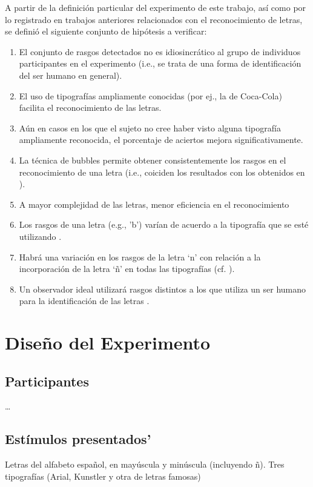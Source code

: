 \documentclass[runningheads,a4paper]{llncs}
\begin{document}
A partir de la definición particular del experimento de este trabajo, así como por lo registrado en trabajos anteriores relacionados con el reconocimiento de letras, se definió el siguiente conjunto de hipótesis a verificar:
\begin{enumerate}
 \item El conjunto de rasgos detectados no es idiosincrático al grupo de individuos participantes en el experimento (i.e., se trata de una forma de identificación del ser humano en general).
 \item El uso de tipografías ampliamente conocidas (por ej., la de Coca-Cola) facilita el reconocimiento de las letras. 
 \item Aún en casos en los que el sujeto no cree haber visto alguna tipografía ampliamente reconocida, el porcentaje de aciertos mejora significativamente.
 \item La técnica de bubbles permite obtener consistentemente los rasgos en el reconocimiento de una letra (i.e., coiciden los resultados con los obtenidos en \cite{FisetEtAl08:BubblesForLetters}).  
 \item A mayor complejidad de las letras, menor eficiencia en el reconocimiento \cite{PelliEtAl06:LetterIdentification}
 \item Los rasgos de una letra (e.g., 'b') varían de acuerdo a la tipografía que se esté utilizando \cite{PelliEtAl06:LetterIdentification}.
 \item Habrá una variación en los rasgos de la letra `n' con relación a la incorporación de la letra `ñ' en todas las tipografías (cf. \cite{FisetEtAl08:BubblesForLetters}).
 \item Un observador ideal utilizará rasgos distintos a los que utiliza un ser humano para la identificación de las letras \cite{PelliEtAl06:LetterIdentification}.
\end{enumerate}

\section{Dise\~no del Experimento}
\label{sec:DisenoExperimento}

\subsection{Participantes}
\ldots

\subsection{Est\'imulos presentados'}
Letras del alfabeto español, en mayúscula y minúscula (incluyendo ñ).
Tres tipografías (Arial, Kunstler y otra de letras famosas)
\end{document}
